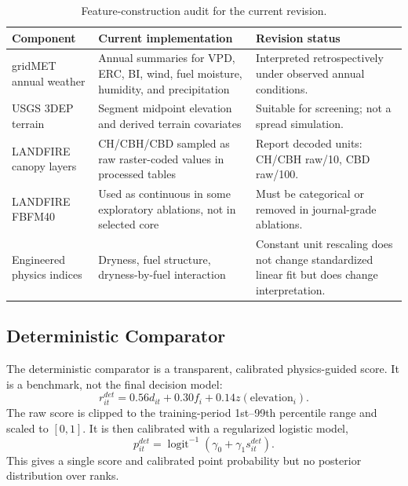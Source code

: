 \documentclass[11pt]{article}
\DeclareMathOperator{\logit}{logit}
\begin{document}
\begin{table}[!htbp]
  \centering
  \small
  \caption{Feature-construction audit for the current revision.}
  \label{tab:feature-audit}
  \begin{tabular}{L{0.26\textwidth} L{0.30\textwidth} L{0.32\textwidth}}
    \toprule
    Component & Current implementation & Revision status \\
    \midrule
    gridMET annual weather & Annual summaries for VPD, ERC, BI, wind, fuel moisture, humidity, and precipitation & Interpreted retrospectively under observed annual conditions. \\
    USGS 3DEP terrain & Segment midpoint elevation and derived terrain covariates & Suitable for screening; not a spread simulation. \\
    LANDFIRE canopy layers & CH/CBH/CBD sampled as raw raster-coded values in processed tables & Report decoded units: CH/CBH raw/10, CBD raw/100. \\
    LANDFIRE FBFM40 & Used as continuous in some exploratory ablations, not in selected core & Must be categorical or removed in journal-grade ablations. \\
    Engineered physics indices & Dryness, fuel structure, dryness-by-fuel interaction & Constant unit rescaling does not change standardized linear fit but does change interpretation. \\
    \bottomrule
  \end{tabular}
\end{table}

\subsection{Deterministic Comparator}

The deterministic comparator is a transparent, calibrated physics-guided score.
It is a benchmark, not the final decision model:
\begin{equation}
  r^{det}_{it}
  =
  0.56 d_{it} + 0.30 f_i + 0.14 z(\mathrm{elevation}_i).
\end{equation}
The raw score is clipped to the training-period 1st--99th percentile range and
scaled to $[0,1]$. It is then calibrated with a regularized logistic model,
\begin{equation}
  p^{det}_{it} = \logit^{-1}(\gamma_0+\gamma_1 s^{det}_{it}).
\end{equation}
This gives a single score and calibrated point probability but no posterior
distribution over ranks.
\end{document}

